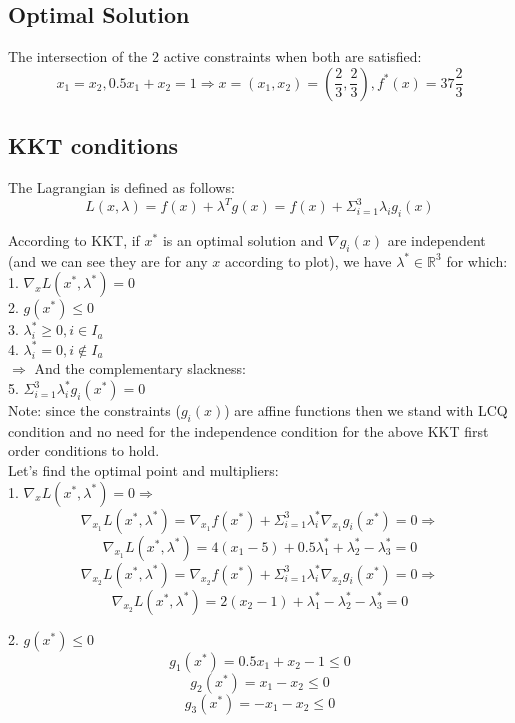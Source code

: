 \documentclass[12pt]{article}
\begin{document}
\subsection{Optimal Solution}

The intersection of the 2 active constraints when both are satisfied:
$$x_1=x_2, 0.5x_1+x_2=1 \Rightarrow x=(x_1,x_2)=(\frac{2}{3},\frac{2}{3}), f^*(x) = 37\frac{2}{3}$$

\subsection{KKT conditions}

The Lagrangian is defined as follows:
$$L(x,\lambda)=f(x) + \lambda^Tg(x) = f(x) + \Sigma_{i=1}^3\lambda_ig_i(x)$$

According to KKT, if $x^*$ is an optimal solution and $\nabla g_i(x)$ are independent (and we can see they are for any $x$ according to plot), we have $\lambda^* \in \mathbb{R}^3$ for which:\\
1. $\nabla_x L(x^*,\lambda^*) = 0$\\
2. $g(x^*)\leq0$\\
3. $\lambda_i^* \geq 0, i \in I_a$\\
4. $\lambda_i^* = 0, i \notin I_a$\\
$\Rightarrow$ And the complementary slackness:\\
5. $\Sigma_{i=1}^3\lambda_i^*g_i(x^*) = 0$\\

Note: since the constraints ($g_i(x)$) are affine functions then we stand with LCQ condition and no need for the independence condition for the above KKT first order conditions to hold.\\

Let's find the optimal point and multipliers:\\

1. $\nabla_x L(x^*,\lambda^*) = 0 \Rightarrow$\\
$$\nabla_{x_1} L(x^*,\lambda^*) = \nabla_{x_1} f(x^*) + \Sigma_{i=1}^3\lambda^*_i\nabla_{x_1} g_i(x^*) = 0\Rightarrow$$
$$\nabla_x_1 L(x^*,\lambda^*) = 4(x_1-5) + 0.5\lambda^*_1 + \lambda^*_2 -\lambda^*_3 = 0$$
$$\nabla_x_2 L(x^*,\lambda^*) = \nabla_{x_2} f(x^*) + \Sigma_{i=1}^3\lambda^*_i\nabla_{x_2} g_i(x^*) = 0\Rightarrow$$
$$\nabla_{x_2} L(x^*,\lambda^*) = 2(x_2-1) + \lambda^*_1 - \lambda^*_2 -\lambda^*_3 = 0$$

2. $g(x^*)\leq0$\\
$$ g_1(x^*) = 0.5x_1 +x_2 -1 \leq 0$$
$$ g_2(x^*) = x_1 -x_2 \leq 0$$
$$ g_3(x^*) = -x_1 -x_2 \leq 0$$
\end{document}
